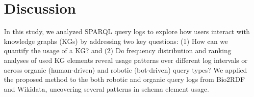 \documentclass[sw]{iosart2x}
\begin{document}

\section{Discussion}\label{s5}
In this study, we analyzed SPARQL query logs to explore how users interact with knowledge graphs (KGs) by addressing two key questions: (1) How can we quantify the usage of a KG? and (2) Do frequency distribution and ranking analyses of used KG elements reveal usage patterns over different log intervals or across organic (human-driven) and robotic (bot-driven) query types? We applied the proposed method to the both robotic and organic query logs from Bio2RDF and Wikidata, uncovering several patterns in schema element usage.
\end{document}
